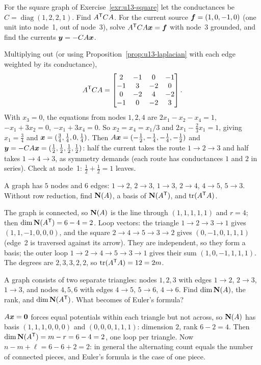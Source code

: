 \begin{exercise}\label{exr:u13-ATCA}
For the square graph of Exercise~\ref{exr:u13-square} let the conductances be
$C=\operatorname{diag}(1,2,2,1)$. Find $A^{\mathsf{T}} CA$. For the current source $\boldsymbol{f}=(1,0,-1,0)$ (one
unit into node~1, out of node~3), solve $A^{\mathsf{T}} CA\boldsymbol{x}=\boldsymbol{f}$ with node~3 grounded, and find the
currents $\boldsymbol{y}=-CA\boldsymbol{x}$.
\end{exercise}
\begin{solution}
Multiplying out (or using Proposition~\ref{prop:u13-laplacian} with each edge weighted by its
conductance),
\[
A^{\mathsf{T}} CA=\begin{bmatrix}2&-1&0&-1\\-1&3&-2&0\\0&-2&4&-2\\-1&0&-2&3\end{bmatrix}.
\]
With $x_3=0$, the equations from nodes $1,2,4$ are $2x_1-x_2-x_4=1$, $-x_1+3x_2=0$,
$-x_1+3x_4=0$. So $x_2=x_4=x_1/3$ and $2x_1-\tfrac23x_1=1$, giving $x_1=\tfrac34$ and
$\boldsymbol{x}=(\tfrac34,\tfrac14,0,\tfrac14)$. Then $A\boldsymbol{x}=(-\tfrac12,-\tfrac14,-\tfrac14,-\tfrac12)$ and
$\boldsymbol{y}=-CA\boldsymbol{x}=(\tfrac12,\tfrac12,\tfrac12,\tfrac12)$: half the current takes the route
$1\to2\to3$ and half takes $1\to4\to3$, as symmetry demands (each route has conductances $1$ and $2$
in series). Check at node~1: $\tfrac12+\tfrac12=1$ leaves.
\end{solution}

\begin{exercise}\label{exr:u13-five}
A graph has $5$ nodes and $6$ edges: $1\to2$, $2\to3$, $1\to3$, $2\to4$, $4\to5$, $5\to3$. Without
row reduction, find $\mathbf{N}(A)$, a basis of $\mathbf{N}(A^{\mathsf{T}})$, and $\operatorname{tr}(A^{\mathsf{T}} A)$.
\end{exercise}
\begin{solution}
The graph is connected, so $\mathbf{N}(A)$ is the line through $(1,1,1,1,1)$ and $r=4$; then
$\dim\mathbf{N}(A^{\mathsf{T}})=6-4=2$. Loop vectors: the triangle $1\to2\to3\to1$ gives $(1,1,-1,0,0,0)$, and the
square $2\to4\to5\to3\to2$ gives $(0,-1,0,1,1,1)$ (edge~2 is traversed against its arrow). They are
independent, so they form a basis; the outer loop $1\to2\to4\to5\to3\to1$ gives their sum
$(1,0,-1,1,1,1)$. The degrees are $2,3,3,2,2$, so $\operatorname{tr}(A^{\mathsf{T}} A)=12=2m$.
\end{solution}

\begin{exercise}\label{exr:u13-disconnected}
A graph consists of two separate triangles: nodes $1,2,3$ with edges $1\to2$, $2\to3$, $1\to3$, and
nodes $4,5,6$ with edges $4\to5$, $5\to6$, $4\to6$. Find $\dim\mathbf{N}(A)$, the rank, and
$\dim\mathbf{N}(A^{\mathsf{T}})$. What becomes of Euler's formula?
\end{exercise}
\begin{solution}
$A\boldsymbol{x}=\boldsymbol{0}$ forces equal potentials within each triangle but not across, so $\mathbf{N}(A)$ has basis
$(1,1,1,0,0,0)$ and $(0,0,0,1,1,1)$: dimension $2$, rank $6-2=4$. Then
$\dim\mathbf{N}(A^{\mathsf{T}})=m-r=6-4=2$, one loop per triangle. Now $n-m+\ell=6-6+2=2$: in general the alternating
count equals the number of connected pieces, and Euler's formula is the case of one piece.
\end{solution}
